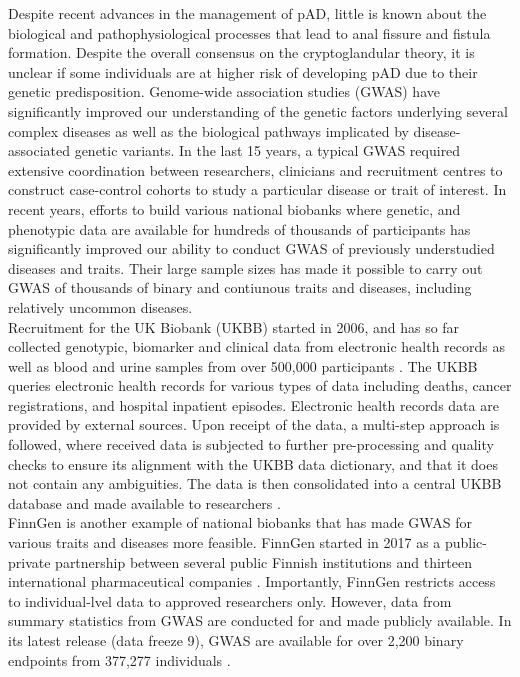 Despite recent advances in the management of pAD, little is known about the biological and pathophysiological processes that lead to anal fissure and fistula formation. Despite the overall consensus on the cryptoglandular theory, it is unclear if some individuals are at higher risk of developing pAD due to their genetic predisposition. Genome-wide association studies (GWAS) have significantly improved our understanding of the genetic factors underlying several complex diseases as well as the biological pathways implicated by disease-associated genetic variants. In the last 15 years, a typical GWAS required extensive coordination between researchers, clinicians and recruitment centres to construct case-control cohorts to study a particular disease or trait of interest. In recent years, efforts to build various national biobanks where genetic, and phenotypic data are available for hundreds of thousands of participants has significantly improved our ability to conduct GWAS of previously understudied diseases and traits. Their large sample sizes has made it possible to carry out GWAS of thousands of binary and contiunous traits and diseases, including relatively uncommon diseases. \\

Recruitment for the UK Biobank (UKBB) started in 2006, and has so far collected genotypic, biomarker and clinical data from electronic health records as well as blood and urine samples from over 500,000 participants \cite{ukbb_showcase}. The UKBB queries electronic health records for various types of data including deaths, cancer registrations, and hospital inpatient episodes. Electronic health records data are provided by external sources. Upon receipt of the data, a multi-step approach is followed, where received data is subjected to further pre-processing and quality checks to ensure its alignment with the UKBB data dictionary, and that it does not contain any ambiguities. The data is then consolidated into a central UKBB database and made available to researchers \cite{ukbb_ehr}.\\

FinnGen is another example of national biobanks that has made GWAS for various traits and diseases more feasible. FinnGen started in 2017 as a public-private partnership between several public Finnish institutions and thirteen international pharmaceutical companies \cite{finngen_forresearchers}. Importantly, FinnGen restricts access to individual-lvel data to approved researchers only. However, data from summary statistics from GWAS are conducted for  and made publicly available. In its latest release (data freeze 9), GWAS are available for over 2,200 binary endpoints from 377,277 individuals \cite{finngen_aboutdf9}. 

